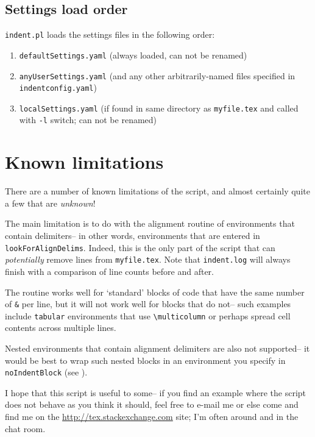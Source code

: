  \subsection{Settings load order}
 	\lstinline!indent.pl! loads the settings files in the following order:
 	\begin{enumerate}
 		\item \lstinline!defaultSettings.yaml! (always loaded, can not be renamed)
 		\item \lstinline!anyUserSettings.yaml! (and any other arbitrarily-named files specified in \lstinline!indentconfig.yaml!)
 		\item \lstinline!localSettings.yaml! (if found in same directory as \lstinline!myfile.tex! and called
 		with \lstinline!-l! switch; can not be renamed)
 	\end{enumerate}
 	 	
\section{Known limitations}\label{sec:knownlimitations}
 There are a number of known limitations of the script, and almost certainly quite a
 few that are \emph{unknown}!
  
 The main limitation is to do with the alignment routine of environments that contain 
 delimiters-- in other words, environments that are entered in \lstinline!lookForAlignDelims!.
 Indeed, this is the only part of the script that can \emph{potentially} remove 
 lines from \lstinline!myfile.tex!. Note that \lstinline!indent.log! will always
 finish with a comparison of line counts before and after. 
  
 The routine works well for `standard' blocks of code that have the same number of \lstinline!&!
 per line, but it will not work well for blocks that do not-- such examples 
 include \lstinline!tabular! environments that use \lstinline!\multicolumn! or 
 perhaps spread cell contents across multiple lines.
  
 Nested environments that contain alignment delimiters are also not supported-- it 
 would be best to wrap such nested blocks in an environment you specify in \lstinline!noIndentBlock! (see ).
  
 I hope that this script is useful to some-- if you find an example where the 
 script does not behave as you think it should, feel free to e-mail me or else
 come and find me on the \url{http://tex.stackexchange.com} site; I'm often around 
 and in the chat room.
  
 \printbibliography[heading=bibintoc]
 
  
